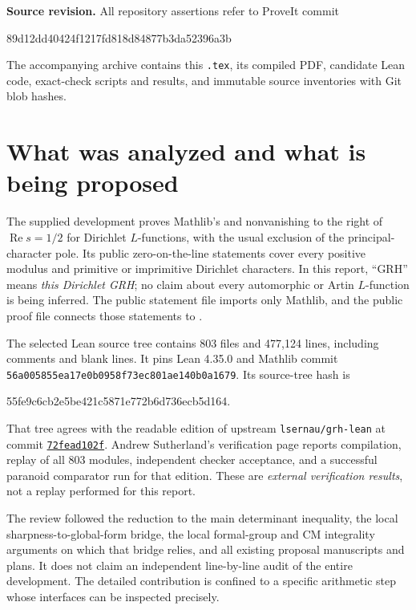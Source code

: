 \documentclass[11pt,letterpaper]{article}
\theoremstyle{remark}\newtheorem{remark}[theorem]{Remark}
\newcommand{\decl}[1]{\textnormal{\small\texttt{\detokenize{#1}}}}
\begin{document}
\textbf{Source revision.} All repository assertions refer to ProveIt commit
\begin{center}\small\ttfamily 89d12dd40424f1217fd818d84877b3da52396a3b\end{center}
The accompanying archive contains this \texttt{.tex}, its compiled PDF,
candidate Lean code, exact-check scripts and results, and immutable source
inventories with Git blob hashes.
\newpage
\begingroup\small\setlength{\parskip}{0pt}\tableofcontents\endgroup
\newpage

\section{What was analyzed and what is being proposed}
\label{sec:scope}

The supplied development proves Mathlib's \decl{RiemannHypothesis} and
nonvanishing to the right of $\operatorname{Re}s=1/2$ for Dirichlet
$L$-functions, with the usual exclusion of the principal-character pole.
Its public zero-on-the-line statements cover every positive modulus and
primitive or imprimitive Dirichlet characters. In this report, ``GRH'' means
\emph{this Dirichlet GRH}; no claim about every automorphic or Artin
$L$-function is being inferred. The public statement file imports only
Mathlib, and the public proof file connects those statements to
\decl{New.grh}.\cite{public}

The selected Lean source tree contains 803 files and 477,124 lines, including
comments and blank lines. It pins Lean 4.35.0 and Mathlib commit
\texttt{56a005855ea17e0b0958f73ec801ae140b0a1679}. Its source-tree hash is
\begin{center}\small\ttfamily 55fe9c6cb2e5be421c5871e772b6d736ecb5d164.\end{center}
That tree agrees with the readable edition of upstream
\texttt{lsernau/grh-lean} at commit
\href{https://github.com/lsernau/grh-lean/commit/72fead102f663d5c7a407964a13dc0cf9d977207}{\texttt{72fead102f}}.
Andrew Sutherland's verification page reports compilation, replay of all
803 modules, independent checker acceptance, and a successful paranoid
comparator run for that edition. These are \emph{external verification
results}, not a replay performed for this report.\cite{verification}

The review followed the reduction to the main determinant inequality, the
local sharpness-to-global-form bridge, the local formal-group and CM
integrality arguments on which that bridge relies, and all existing proposal
manuscripts and plans. It does not claim an independent line-by-line audit
of the entire development. The detailed contribution is confined to a
specific arithmetic step whose interfaces can be inspected precisely.
\end{document}
